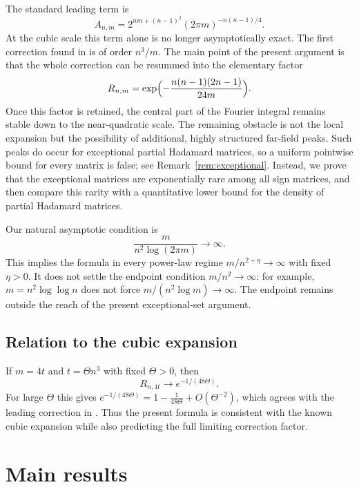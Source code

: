\documentclass[11pt,reqno]{amsart}
\theoremstyle{plain}
\theoremstyle{definition}
\theoremstyle{remark}
\begin{document}
The standard leading term is
\[
  A_{n,m}=2^{nm+(n-1)^2}(2\pi m)^{-n(n-1)/4}.
\]
At the cubic scale this term alone is no longer asymptotically exact. The first
correction found in \cite{Davis2026} is of order \(n^3/m\). The main point of
the present argument is that the whole correction can be resummed into the
elementary factor
\[
  R_{n,m}=\exp\Bigl(-\frac{n(n-1)(2n-1)}{24m}\Bigr).
\]
Once this factor is retained, the central part of the Fourier integral remains
stable down to the near-quadratic scale. The remaining obstacle is not the
local expansion but the possibility of additional, highly structured far-field
peaks. Such peaks do occur for exceptional partial Hadamard matrices, so a
uniform pointwise bound for every matrix is false; see
Remark~\ref{rem:exceptional}. Instead, we prove that the exceptional matrices
are exponentially rare among all sign matrices, and then compare this rarity
with a quantitative lower bound for the density of partial Hadamard matrices.

Our natural asymptotic condition is
\[
  \frac{m}{n^2\log(2\pi m)}\longrightarrow\infty.
\]
This implies the formula in every power-law regime \(m/n^{2+\eta}\to\infty\)
with fixed \(\eta>0\). It does not settle the endpoint condition
\(m/n^2\to\infty\): for example, \(m=n^2\log\log n\) does not force
\(m/(n^2\log m)\to\infty\). The endpoint remains outside the reach of the
present exceptional-set argument.

\subsection*{Relation to the cubic expansion}
If \(m=4t\) and \(t=\Theta n^3\) with fixed \(\Theta>0\), then
\[
  R_{n,4t}\longrightarrow e^{-1/(48\Theta)}.
\]
For large \(\Theta\) this gives
\(e^{-1/(48\Theta)}=1-\tfrac1{48\Theta}+O(\Theta^{-2})\), which agrees with the
leading correction in \cite{Davis2026}. Thus the present formula is consistent
with the known cubic expansion while also predicting the full limiting
correction factor.

\section{Main results}
\end{document}
